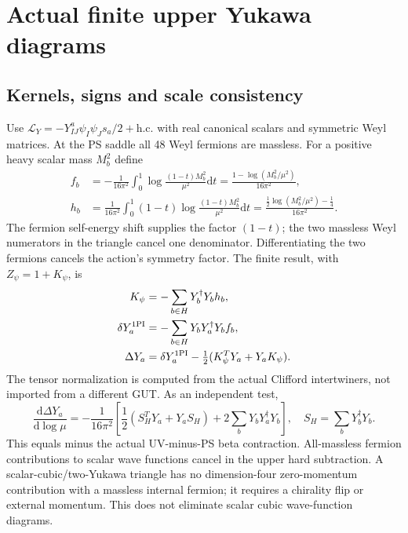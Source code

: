 \documentclass[11pt]{article}
\newcommand{\dd}{\mathrm d}
\begin{document}
\section{Actual finite upper Yukawa diagrams}
\subsection{Kernels, signs and scale consistency}
Use $\mathcal L_Y=-Y^a_{IJ}\psi_I\psi_Js_a/2+\mathrm{h.c.}$
with real canonical scalars and symmetric Weyl matrices. At the PS
saddle all 48 Weyl fermions are massless. For a positive heavy scalar
mass $M_b^2$ define
\begin{align}
 f_b&=-\frac1{16\pi^2}\int_0^1\log\frac{(1-t)M_b^2}{\mu^2}\dd t
 =\frac{1-\log(M_b^2/\mu^2)}{16\pi^2},\\
 h_b&=\frac1{16\pi^2}\int_0^1(1-t)
 \log\frac{(1-t)M_b^2}{\mu^2}\dd t
 =\frac{\frac12\log(M_b^2/\mu^2)-\frac14}{16\pi^2}.
\end{align}
The fermion self-energy shift supplies the factor $(1-t)$; the two
massless Weyl numerators in the triangle cancel one denominator.
Differentiating the two fermions cancels the action's symmetry factor.
The finite result, with $Z_\psi=1+K_\psi$, is
\begin{align}
 K_\psi&=-\sum_{b\in H}Y_b^\dagger Y_bh_b,\\
 \delta Y_a^{\rm 1PI}&=-\sum_{b\in H}Y_bY_a^\dagger Y_bf_b,\\
 \Delta Y_a&=\delta Y_a^{\rm 1PI}
 -\tfrac12(K_\psi^TY_a+Y_aK_\psi). \label{eq:finiteY}
\end{align}
The tensor normalization is computed from the actual Clifford
intertwiners, not imported from a different GUT. As an independent test,
\begin{equation}
 \frac{\dd\Delta Y_a}{\dd\log\mu}=-\frac1{16\pi^2}
 \left[\frac12(S_H^TY_a+Y_aS_H)
 +2\sum_bY_bY_a^\dagger Y_b\right],\quad S_H=\sum_bY_b^\dagger Y_b.
\end{equation}
This equals minus the actual UV-minus-PS beta contraction. All-massless
fermion contributions to scalar wave functions cancel in the upper
hard subtraction. A scalar-cubic/two-Yukawa triangle has no dimension-four
zero-momentum contribution with a massless internal fermion; it requires
a chirality flip or external momentum. This does not eliminate scalar
cubic wave-function diagrams.
\end{document}
